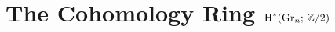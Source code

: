 \documentclass[../main]{subfiles}
\begin{document}
\chapter{The Cohomology Ring \texorpdfstring{$\operatorname{H}^\ast(\operatorname{Gr}_n;\,\mathbb Z/2)$}{H*(Gr n; Z/2}}\label{ch:7}



\end{document}
